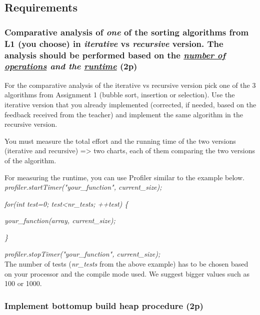 \documentclass[../en-fa-lab.tex]{subfiles}
\begin{document}
\subsection{Requirements}\label{requirements}

\subsubsection{\texorpdfstring{Comparative analysis of \emph{one} of the
sorting algorithms from L1 (you choose) in \emph{iterative} vs
\emph{recursive} version. The analysis should be performed based on the
\emph{\ul{number of operations} and the \ul{runtime}}
(2p)}{Comparative analysis of one of the sorting algorithms from L1 (you choose) in iterative vs recursive version. The analysis should be performed based on the number of operations and the runtime (2p)}}\label{comparative-analysis-of-one-of-the-sorting-algorithms-from-l1-you-choose-in-iterative-vs-recursive-version.-the-analysis-should-be-performed-based-on-the-number-of-operations-and-the-runtime-2p}

For the comparative analysis of the iterative vs recursive version pick
one of the 3 algorithms from Assignment 1 (bubble sort, insertion or
selection). Use the iterative version that you already implemented
(corrected, if needed, based on the feedback received from the teacher)
and implement the same algorithm in the recursive version.

You must measure the total effort and the running time of the two
versions (iterative and recursive) =\textgreater{} two charts, each of
them comparing the two versions of the algorithm.

For measuring the runtime, you can use Profiler similar to the example
below. 
\\

\emph{profiler.startTimer("your\_function", current\_size);}

\emph{for(int test=0; test\textless nr\_tests; ++test) \{}

\quad\emph{your\_function(array, current\_size);}

\emph{\}}

\emph{profiler.stopTimer("your\_function", current\_size);}
\\

The number of tests (\emph{nr\_tests} from the above example) has to be
chosen based on your processor and the compile mode used. We suggest
bigger values such as 100 or 1000.

\subsubsection{Implement bottom­up build heap procedure
(2p)}\label{implement-bottomup-build-heap-procedure-2p}
\end{document}
